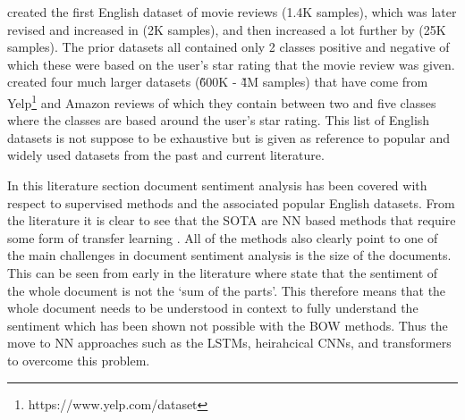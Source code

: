 \citet{pang-etal-2002-thumbs} created the first English dataset of movie reviews (1.4K samples), which was later revised and increased in \citet{pang-lee-2004-sentimental} (2K samples), and then increased a lot further by \citet{maas-etal-2011-learning} (25K samples). The prior datasets all contained only 2 classes positive and negative of which these were based on the user's star rating that the movie review was given. \citet{zhang2015character} created four much larger datasets (\~600K - \~4M samples) that have come from Yelp\footnote{https://www.yelp.com/dataset} and Amazon reviews \citep{mcauley2015image} of which they contain between two and five classes where the classes are based around the user's star rating. This list of English datasets is not suppose to be exhaustive but is given as reference to popular and widely used datasets from the past and current literature.

In this literature section document sentiment analysis has been covered with respect to supervised methods and the associated popular English datasets. From the literature it is clear to see that the SOTA are NN based methods that require some form of transfer learning \citep{yang2019xlnet}. All of the methods also clearly point to one of the main challenges in document sentiment analysis is the size of the documents. This can be seen from early in the literature where  \citet{turney-2002-thumbs} state that the sentiment of the whole document is not the `sum of the parts'. This therefore means that the whole document needs to be understood in context to fully understand the sentiment which has been shown not possible with the BOW methods. Thus the move to NN approaches such as the LSTMs, heirahcical CNNs, and transformers to overcome this problem.





